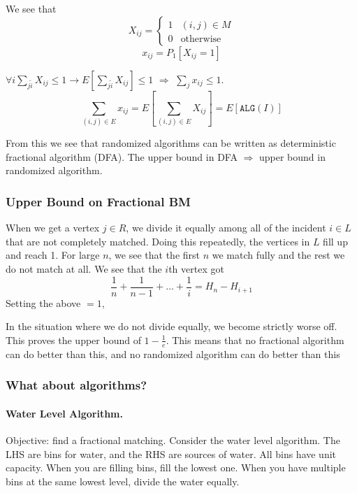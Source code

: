 We see that 
\begin{equation*}
  X_{ij} =
  \begin{cases}
    1 & (i,j) \in M \\
    0 & \mbox{otherwise}
  \end{cases}
\end{equation*}
\begin{equation*}
  x_{ij} = P_{1}[X_{ij} = 1]
\end{equation*}

$\forall i \sum_{j \tilde i} X_{ij} \leq 1 \rightarrow E[\sum_{j \tilde i} X_{ij}] \leq 1$ $\Rightarrow$ $\sum_{j} x_{ij} \leq 1$. 
\begin{equation*}
  \sum_{(i,j) \in E} x_{ij} = E[\sum_{(i,j) \in E} X_{ij}] = E[\mathtt{ALG}(I)]
\end{equation*}

From this we see that randomized algorithms can be written as deterministic fractional algorithm (DFA). The upper bound in DFA $\Rightarrow$ upper bound in randomized algorithm.

\subsubsection{Upper Bound on Fractional BM}
\label{sec:upper-bound-fract}
When we get a vertex $j \in R$, we divide it equally among all of the incident $i \in L$ that are not completely matched. Doing this repeatedly, the vertices in $L$ fill up and reach 1. For large $n$, we see that the first $n$ we match fully and the rest we do not match at all. We see that the $i$th vertex got
\begin{equation*}
  \frac{1}{n} + \frac{1}{n-1} + ... + \frac{1}{i} = H_{n} - H_{i+1} 
\end{equation*}
Setting the above $=1$, %


In the situation where we do not divide equally, we become strictly worse off. This proves the upper bound of $1 - \frac{1}{e}$. This means that no fractional algorithm can do better than this, and no randomized algorithm can do better than this


\subsubsection{What about algorithms?}

\paragraph{Water Level Algorithm.} Objective: find a fractional matching. Consider the water level algorithm. The LHS are bins for water, and the RHS are sources of water. All bins have unit capacity. When you are filling bins, fill the lowest one. When you have multiple bins at the same lowest level, divide the water equally.


